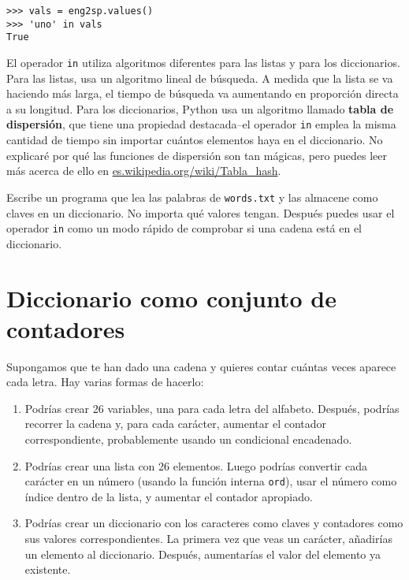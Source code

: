 
\beforeverb
\begin{verbatim}
>>> vals = eng2sp.values()
>>> 'uno' in vals
True
\end{verbatim}
\afterverb
%
El operador {\tt in} utiliza algoritmos diferentes para las listas y
para los diccionarios. Para las listas, usa un algoritmo lineal de búsqueda.
A medida que la lista se va haciendo más larga, el tiempo de búsqueda
va aumentando en proporción directa a su longitud.
Para los diccionarios, Python usa un
algoritmo llamado {\bf tabla de dispersión}, que tiene una propiedad destacada--el
operador {\tt in} emplea la misma cantidad de tiempo sin importar cuántos
elementos haya en el diccionario. No explicaré
por qué las funciones de dispersión son tan mágicas,
pero puedes leer más acerca de ello en
\url{es.wikipedia.org/wiki/Tabla_hash}.


\begin{ex}
\label{wordlist2}


Escribe un programa que lea las palabras de {\tt words.txt} y
las almacene como claves en un diccionario. No importa qué
valores tengan. Después puedes usar el operador {\tt in}
como un modo rápido de comprobar si una cadena está en el
diccionario.

\end{ex}


\section{Diccionario como conjunto de contadores}
\label{histograma}


Supongamos que te han dado una cadena y quieres contar cuántas veces
aparece cada letra. Hay varias formas de hacerlo:

\begin{enumerate}

\item Podrías crear 26 variables, una para cada letra del
alfabeto. Después, podrías recorrer la cadena y, para cada
carácter, aumentar el contador correspondiente, probablemente
usando un condicional encadenado.

\item Podrías crear una lista con 26 elementos. Luego podrías
convertir cada carácter en un número (usando la función interna
{\tt ord}), usar el número como índice dentro de la lista, y aumentar
el contador apropiado.

\item Podrías crear un diccionario con los caracteres como claves
y contadores como sus valores correspondientes. La primera vez
que veas un carácter, añadirías un elemento al diccionario.
Después, aumentarías el valor del elemento ya existente.

\end{enumerate}

